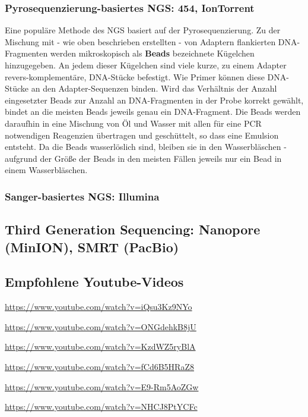 \subsubsection{Pyrosequenzierung-basiertes NGS: 454, IonTorrent}

Eine populäre Methode des NGS basiert auf der Pyrosequenzierung. Zu der Mischung mit - wie oben beschrieben erstellten - von Adaptern flankierten DNA-Fragmenten werden mikroskopisch als \textbf{Beads} bezeichnete Kügelchen hinzugegeben. An jedem dieser Kügelchen sind viele kurze, zu einem Adapter revers-komplementäre, DNA-Stücke befestigt. Wie Primer können diese DNA-Stücke an den Adapter-Sequenzen binden. Wird das Verhältnis der Anzahl eingesetzter Beads zur Anzahl an DNA-Fragmenten in der Probe korrekt gewählt, bindet an die meisten Beads jeweils genau ein DNA-Fragment. Die Beads werden daraufhin in eine Mischung von Öl und Wasser mit allen für eine PCR notwendigen Reagenzien übertragen und geschüttelt, so dass eine Emulsion entsteht. Da die Beads wasserlöslich sind, bleiben sie in den Wasserbläschen - aufgrund der Größe der Beads in den meisten Fällen jeweils nur ein Bead in einem Wasserbläschen. 

\subsubsection{Sanger-basiertes NGS: Illumina}

\subsection{Third Generation Sequencing: Nanopore (MinION), SMRT (PacBio)}

\subsection{Empfohlene Youtube-Videos}
\begin{description}[align=left]
	\item [PCR] \href{https://www.youtube.com/watch?v=iQsu3Kz9NYo}{https://www.youtube.com/watch?v=iQsu3Kz9NYo}
	\item [Sanger-Sequenzierung] \href{https://www.youtube.com/watch?v=ONGdehkB8jU}{https://www.youtube.com/watch?v=ONGdehkB8jU}
	\item [454-Sequenzierung] \href{https://www.youtube.com/watch?v=KzdWZ5ryBlA}{https://www.youtube.com/watch?v=KzdWZ5ryBlA}
	\item [Illumina-Sequenzierung] \href{https://www.youtube.com/watch?v=fCd6B5HRaZ8}{https://www.youtube.com/watch?v=fCd6B5HRaZ8}
	\item [Nanopore-Sequenzierung] \href{https://www.youtube.com/watch?v=E9-Rm5AoZGw}{https://www.youtube.com/watch?v=E9-Rm5AoZGw}
	\item [SMRT-Sequenzierung] \href{https://www.youtube.com/watch?v=NHCJ8PtYCFc}{https://www.youtube.com/watch?v=NHCJ8PtYCFc}
\end{description}

